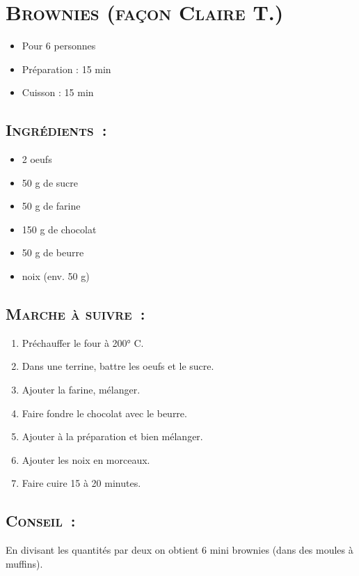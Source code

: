 \section[\normalsize{Brownies (fa\c con Claire T.)}]{\LARGE{\textsc{Brownies (fa\c con Claire T.)}}}		%


\begin{itemize}
\item Pour 6 personnes
\item Préparation : 15 min
\item Cuisson : 15 min
\end{itemize}

\subsection*{\textsc{Ingr\'edients~:}}

\begin{itemize}
\item 2 oeufs
\item 50 g de sucre
\item 50 g de farine
\item 150 g de chocolat
\item 50 g de beurre
\item noix (env. 50 g)
\end{itemize}


\subsection*{\textsc{Marche \`a suivre~:}}

\begin{enumerate}
\item Pr\'echauffer le four \`a 200° C.
\item Dans une terrine, battre les oeufs et le sucre. 
\item Ajouter la farine, m\'elanger.
\item Faire fondre le chocolat avec le beurre. 
\item Ajouter \`a la pr\'eparation et bien m\'elanger.
\item Ajouter les noix en morceaux.
\item Faire cuire 15 \`a 20 minutes.
\end{enumerate}
\subsection*{\textsc{Conseil~:}}
En divisant les quantit\'es par deux on obtient 6 mini brownies (dans des moules \`a muffins).